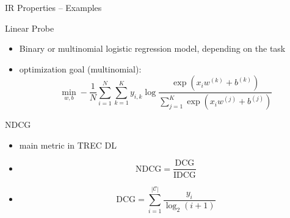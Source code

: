 \documentclass[aspectratio=169]{beamer}
\begin{document}
\begin{frame}{IR Properties -- Examples}
    \begin{figure}[!ht]
        \centering
    \end{figure}
\end{frame}

\begin{frame}{Linear Probe}
    \begin{itemize}
        \item Binary or multinomial logistic regression model, depending on the task
        \item optimization goal (multinomial): \begin{equation}
                  \min_{w, b} - \frac{1}{N} \sum_{i=1}^N\sum_{k=1}^K y_{i,k} \log \frac{\exp(x_iw^{(k)} + b^{(k)})}{\sum_{j=1}^K \exp(x_iw^{(j)} + b^{(j)})}
              \end{equation}
    \end{itemize}
\end{frame}

\begin{frame}{NDCG}
    \begin{itemize}
        \item main metric in TREC DL
        \item \begin{equation}
                  \textrm{NDCG}= \frac{\textrm{DCG}}{\textrm{IDCG}}
              \end{equation}
        \item \begin{equation}
                  \textrm{DCG} = \sum_{i=1}^{|\mathcal{C}|} \frac{y_i}{\log_2(i + 1)}
              \end{equation}
    \end{itemize}
\end{frame}
\end{document}
